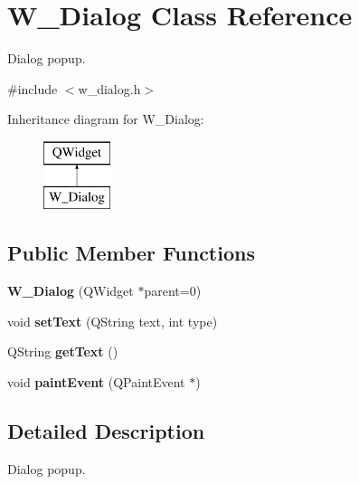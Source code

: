 \hypertarget{class_w___dialog}{}\section{W\+\_\+\+Dialog Class Reference}
\label{class_w___dialog}


Dialog popup.  




{\ttfamily \#include $<$w\+\_\+dialog.\+h$>$}

Inheritance diagram for W\+\_\+\+Dialog\+:\begin{figure}[H]
\begin{center}
\leavevmode
\includegraphics[height=2.000000cm]{class_w___dialog}
\end{center}
\end{figure}
\subsection*{Public Member Functions}
\begin{DoxyCompactItemize}
\item 
\hypertarget{class_w___dialog_a0781c87ca113e6e99f1228004308ce35}{}{\bfseries W\+\_\+\+Dialog} (Q\+Widget $\ast$parent=0)\label{class_w___dialog_a0781c87ca113e6e99f1228004308ce35}

\item 
\hypertarget{class_w___dialog_a720d81ba9f37cadb4d2c0f8669b87b9d}{}void {\bfseries set\+Text} (Q\+String text, int type)\label{class_w___dialog_a720d81ba9f37cadb4d2c0f8669b87b9d}

\item 
\hypertarget{class_w___dialog_af944a68703c890ea23579555d0cbb56d}{}Q\+String {\bfseries get\+Text} ()\label{class_w___dialog_af944a68703c890ea23579555d0cbb56d}

\item 
\hypertarget{class_w___dialog_aaef9669f2146fedba5916305e5f3b11e}{}void {\bfseries paint\+Event} (Q\+Paint\+Event $\ast$)\label{class_w___dialog_aaef9669f2146fedba5916305e5f3b11e}

\end{DoxyCompactItemize}


\subsection{Detailed Description}
Dialog popup. 

